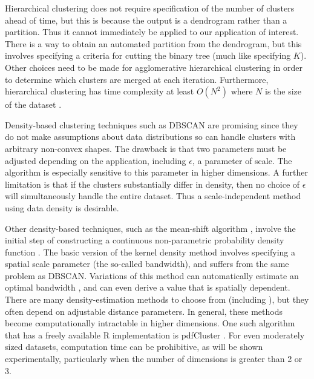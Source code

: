 \documentclass[10pt]{article}
\begin{document}
Hierarchical clustering \cite[Ch.~14]{zaki-book} does not require specification of the number of clusters ahead of time, but this is because the output is a dendrogram rather than a partition. Thus it cannot immediately be applied to our application of interest. There is a way to obtain an automated partition from the dendrogram, but this involves specifying a criteria for cutting the binary tree (much like specifying $K$). Other choices need to be made for agglomerative hierarchical clustering in order to determine which clusters are merged at each iteration. Furthermore, hierarchical clustering has time complexity at least $O(N^2)$ where $N$ is the size of the dataset \cite[Sec.~14.2.3]{zaki-book}.

Density-based clustering techniques such as DBSCAN \cite{dbscan} are promising since they do not make assumptions about
data distributions %
so can handle clusters with arbitrary non-convex shapes. The drawback is that two parameters must be adjusted depending on the application, including $\epsilon$, a parameter of scale. The algorithm is especially sensitive to this parameter in higher dimensions. A further limitation is that if the clusters
substantially differ in density, then no choice of $\epsilon$ will simultaneously handle the entire dataset. Thus a scale-independent method using data density is desirable.

Other density-based techniques, such as the mean-shift algorithm \cite{mean-shift}, involve the initial step of constructing a continuous non-parametric probability density function \cite[Ch.~15]{zaki-book}. The basic version of the kernel density method \cite{kernel-density-function-1,kernel-density-function-2} involves specifying a spatial scale parameter (the so-called bandwidth), and suffers from the same problem as DBSCAN. Variations of this method can automatically estimate an optimal bandwidth \cite{silverman-density-estimation}, and can even derive a value that is spatially dependent. There are many density-estimation methods to choose from (including \cite{rodriguez-clustering}), but they often depend on adjustable distance parameters.
In general, these methods become computationally intractable in higher dimensions. One such algorithm that has a freely available R implementation is pdfCluster \cite{pdfcluster}. For even moderately sized datasets, computation time can be prohibitive, as will be shown experimentally, particularly when the number of dimensions is greater than 2 or 3.
\end{document}
